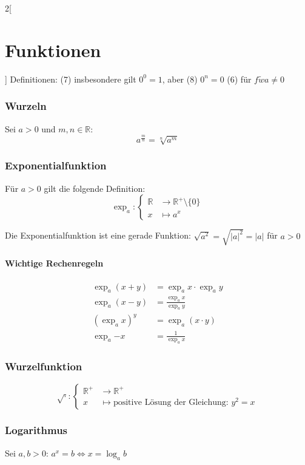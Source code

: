 \begin{multicols}{2}[
	\section{Funktionen}
]
	Definitionen: \newline	
	(7) insbesondere gilt $0^0=1$, aber (8) $0^n=0$ \newline	
	(6) für $f\tilde{w} a \not= 0$

\subsubsection{Wurzeln}
	Sei $a>0$ und $m,n \in \mathbb{R}$:
	\[
		a^\frac{m}{n} = \sqrt[n]{a^m}
	\]

\subsubsection{Exponentialfunktion}
	
	Für $a>0$ gilt die folgende Definition:
	\[
		\exp_a : \begin{cases}
			\mathbb{R} &\to \mathbb{R^+}\setminus \{0\} \\
			x &\mapsto a^x
		\end{cases}
	\]	

	Die Exponentialfunktion ist eine gerade Funktion:
	$\sqrt{a^2} = \sqrt{\left|a\right|^2} = \left|a\right|$ für $a > 0$

	\paragraph{Wichtige Rechenregeln}
		\begin{align*}
			\exp_a{(x+y)} &= \exp_a{x} \cdot \exp_a{y} \\
			\exp_a{(x-y)} &= \frac{\exp_a{x}}{\exp_a{y}} \\
			(\exp_a{x})^y &= \exp_a{(x \cdot y)} \\
			\exp_a{-x} &= \frac{1}{\exp_a{x}}
		\end{align*}
	
\subsubsection{Wurzelfunktion}
	\[
		\sqrt{\cdot} : \begin{cases}
			\mathbb{R}^+ &\to \mathbb{R}^+ \\
			x & \mapsto \text{positive Lösung der Gleichung: $y^2=x$}
		\end{cases}
	\]

\subsubsection{Logarithmus}
	Sei $a,b > 0$: $a^x = b  \iff x = \log_a{b}$


\end{multicols}
